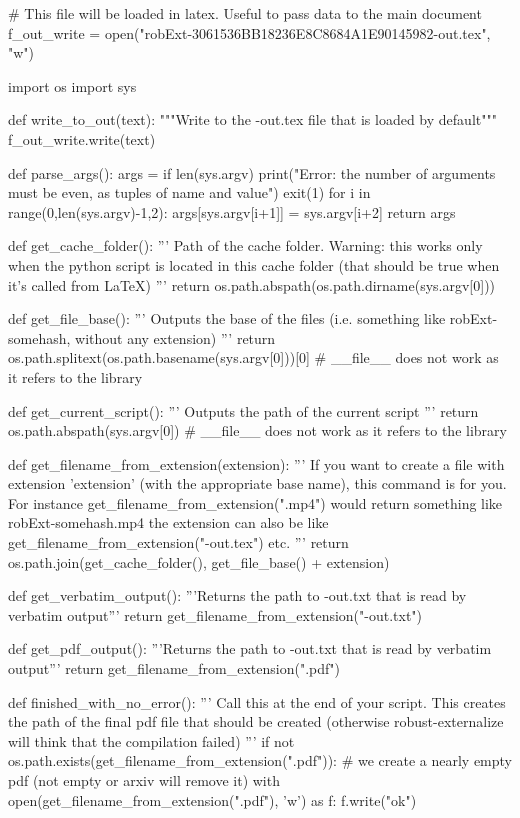 
# This file will be loaded in latex. Useful to pass data to the main document
f_out_write = open("robExt-3061536BB18236E8C8684A1E90145982-out.tex", "w")

import os
import sys

def write_to_out(text):
    """Write to the -out.tex file that is loaded by default"""
    f_out_write.write(text)

def parse_args():
    args = {}
    if len(sys.argv) %
        print("Error: the number of arguments must be even, as tuples of name and value")
        exit(1)
    for i in range(0,len(sys.argv)-1,2):
        args[sys.argv[i+1]] = sys.argv[i+2]
    return args

def get_cache_folder():
    '''
    Path of the cache folder. Warning: this works only when the python script
    is located in this cache folder (that should be true when it's called from LaTeX)
    '''
    return os.path.abspath(os.path.dirname(sys.argv[0]))

def get_file_base():
    '''
    Outputs the base of the files (i.e. something like robExt-somehash, without any extension)
    '''
    return os.path.splitext(os.path.basename(sys.argv[0]))[0] # __file__ does not work as it refers to the library

def get_current_script():
    '''
    Outputs the path of the current script
    '''
    return os.path.abspath(sys.argv[0]) # __file__ does not work as it refers to the library


def get_filename_from_extension(extension):
    '''
    If you want to create a file with extension 'extension' (with the appropriate base name), this command
    is for you. For instance get_filename_from_extension(".mp4") would return something like
    robExt-somehash.mp4
    the extension can also be like get_filename_from_extension("-out.tex") etc.
    '''
    return os.path.join(get_cache_folder(), get_file_base() + extension)

def get_verbatim_output():
    '''Returns the path to -out.txt that is read by verbatim output'''
    return get_filename_from_extension("-out.txt")

def get_pdf_output():
    '''Returns the path to -out.txt that is read by verbatim output'''
    return get_filename_from_extension(".pdf")


def finished_with_no_error():
    '''
    Call this at the end of your script. This creates the path of the final pdf file that should be
    created (otherwise robust-externalize will think that the compilation failed)
    '''
    if not os.path.exists(get_filename_from_extension(".pdf")):
        # we create a nearly empty pdf (not empty or arxiv will remove it)
        with open(get_filename_from_extension(".pdf"), 'w') as f:
            f.write("ok")

